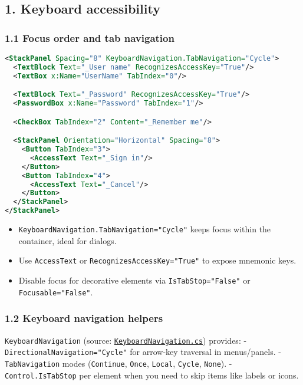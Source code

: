 \subsection{1. Keyboard accessibility}\label{keyboard-accessibility}

\subsubsection{1.1 Focus order and tab
navigation}\label{focus-order-and-tab-navigation}

\begin{lstlisting}[language=XML]
<StackPanel Spacing="8" KeyboardNavigation.TabNavigation="Cycle">
  <TextBlock Text="_User name" RecognizesAccessKey="True"/>
  <TextBox x:Name="UserName" TabIndex="0"/>

  <TextBlock Text="_Password" RecognizesAccessKey="True"/>
  <PasswordBox x:Name="Password" TabIndex="1"/>

  <CheckBox TabIndex="2" Content="_Remember me"/>

  <StackPanel Orientation="Horizontal" Spacing="8">
    <Button TabIndex="3">
      <AccessText Text="_Sign in"/>
    </Button>
    <Button TabIndex="4">
      <AccessText Text="_Cancel"/>
    </Button>
  </StackPanel>
</StackPanel>
\end{lstlisting}

\begin{itemize}
\tightlist
\item
  \passthrough{\lstinline!KeyboardNavigation.TabNavigation="Cycle"!}
  keeps focus within the container, ideal for dialogs.
\item
  Use \passthrough{\lstinline!AccessText!} or
  \passthrough{\lstinline!RecognizesAccessKey="True"!} to expose
  mnemonic keys.
\item
  Disable focus for decorative elements via
  \passthrough{\lstinline!IsTabStop="False"!} or
  \passthrough{\lstinline!Focusable="False"!}.
\end{itemize}

\subsubsection{1.2 Keyboard navigation
helpers}\label{keyboard-navigation-helpers}

\passthrough{\lstinline!KeyboardNavigation!} (source:
\href{https://github.com/AvaloniaUI/Avalonia/blob/master/src/Avalonia.Base/Input/KeyboardNavigation.cs}{\passthrough{\lstinline!KeyboardNavigation.cs!}})
provides: - \passthrough{\lstinline!DirectionalNavigation="Cycle"!} for
arrow-key traversal in menus/panels. -
\passthrough{\lstinline!TabNavigation!} modes
(\passthrough{\lstinline!Continue!}, \passthrough{\lstinline!Once!},
\passthrough{\lstinline!Local!}, \passthrough{\lstinline!Cycle!},
\passthrough{\lstinline!None!}). -
\passthrough{\lstinline!Control.IsTabStop!} per element when you need to
skip items like labels or icons.

